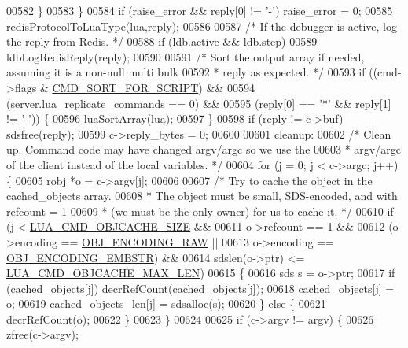 \begin{DoxyCode}
{{{{{{{00582         \}
00583     \}
00584     \textcolor{keywordflow}{if} (raise\_error && reply[0] != \textcolor{stringliteral}{'-'}) raise\_error = 0;
00585     redisProtocolToLuaType(lua,reply);
00586 
00587     \textcolor{comment}{/* If the debugger is active, log the reply from Redis. */}
00588     \textcolor{keywordflow}{if} (ldb.active && ldb.step)
00589         ldbLogRedisReply(reply);
00590 
00591     \textcolor{comment}{/* Sort the output array if needed, assuming it is a non-null multi bulk}
00592 \textcolor{comment}{     * reply as expected. */}
00593     \textcolor{keywordflow}{if} ((cmd->flags & \hyperlink{server_8h_a819ad39aa4aef302c4421c3cd910252d}{CMD\_SORT\_FOR\_SCRIPT}) &&
00594         (server.lua\_replicate\_commands == 0) &&
00595         (reply[0] == \textcolor{stringliteral}{'*'} && reply[1] != \textcolor{stringliteral}{'-'})) \{
00596             luaSortArray(lua);
00597     \}
00598     \textcolor{keywordflow}{if} (reply != c->buf) sdsfree(reply);
00599     c->reply\_bytes = 0;
00600 
00601 cleanup:
00602     \textcolor{comment}{/* Clean up. Command code may have changed argv/argc so we use the}
00603 \textcolor{comment}{     * argv/argc of the client instead of the local variables. */}
00604     \textcolor{keywordflow}{for} (j = 0; j < c->argc; j++) \{
00605         robj *o = c->argv[j];
00606 
00607         \textcolor{comment}{/* Try to cache the object in the cached\_objects array.}
00608 \textcolor{comment}{         * The object must be small, SDS-encoded, and with refcount = 1}
00609 \textcolor{comment}{         * (we must be the only owner) for us to cache it. */}
00610         \textcolor{keywordflow}{if} (j < \hyperlink{scripting_8c_a850a6381c0da4c20a2a6bfdd1cd179b4}{LUA\_CMD\_OBJCACHE\_SIZE} &&
00611             o->refcount == 1 &&
00612             (o->encoding == \hyperlink{server_8h_a148bc85e3074e324a6dc5eebcad1bcd5}{OBJ\_ENCODING\_RAW} ||
00613              o->encoding == \hyperlink{server_8h_ac5bb76b546161fd0da4b0ff89b3142ee}{OBJ\_ENCODING\_EMBSTR}) &&
00614             sdslen(o->ptr) <= \hyperlink{scripting_8c_ab2fd5c42d2e8edae6134b3d56184affc}{LUA\_CMD\_OBJCACHE\_MAX\_LEN})
00615         \{
00616             sds s = o->ptr;
00617             \textcolor{keywordflow}{if} (cached\_objects[j]) decrRefCount(cached\_objects[j]);
00618             cached\_objects[j] = o;
00619             cached\_objects\_len[j] = sdsalloc(s);
00620         \} \textcolor{keywordflow}{else} \{
00621             decrRefCount(o);
00622         \}
00623     \}
00624 
00625     \textcolor{keywordflow}{if} (c->argv != argv) \{
00626         zfree(c->argv);
}}}}}}}
\end{DoxyCode}
